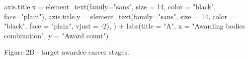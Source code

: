 \documentclass[
]{article}
\newenvironment{Shaded}{\begin{snugshade}}{\end{snugshade}}
\newcommand{\AttributeTok}[1]{\textcolor[rgb]{0.77,0.63,0.00}{#1}}
\newcommand{\DecValTok}[1]{\textcolor[rgb]{0.00,0.00,0.81}{#1}}
\newcommand{\FunctionTok}[1]{\textcolor[rgb]{0.00,0.00,0.00}{#1}}
\newcommand{\NormalTok}[1]{#1}
\newcommand{\SpecialCharTok}[1]{\textcolor[rgb]{0.00,0.00,0.00}{#1}}
\newcommand{\StringTok}[1]{\textcolor[rgb]{0.31,0.60,0.02}{#1}}
\begin{document}
\begin{Shaded}
\begin{Highlighting}[]
                    \AttributeTok{axis.title.x =} \FunctionTok{element\_text}\NormalTok{(}\AttributeTok{family=}\StringTok{"sans"}\NormalTok{, }\AttributeTok{size =} \DecValTok{14}\NormalTok{, }\AttributeTok{color =} \StringTok{"black"}\NormalTok{, }\AttributeTok{face=}\StringTok{"plain"}\NormalTok{), }
                    \AttributeTok{axis.title.y =} \FunctionTok{element\_text}\NormalTok{(}\AttributeTok{family=}\StringTok{"sans"}\NormalTok{, }\AttributeTok{size =} \DecValTok{14}\NormalTok{, }\AttributeTok{color =} \StringTok{"black"}\NormalTok{, }\AttributeTok{face =} \StringTok{"plain"}\NormalTok{, }\AttributeTok{vjust =} \SpecialCharTok{{-}}\DecValTok{2}\NormalTok{),}
\NormalTok{                    ) }\SpecialCharTok{+}
    \FunctionTok{labs}\NormalTok{(}\AttributeTok{title =} \StringTok{"A"}\NormalTok{, }\AttributeTok{x =} \StringTok{"Awarding bodies combination"}\NormalTok{, }\AttributeTok{y =} \StringTok{"Award count"}\NormalTok{)}
\end{Highlighting}
\end{Shaded}

Figure 2B - target awardee career stages.
\end{document}
